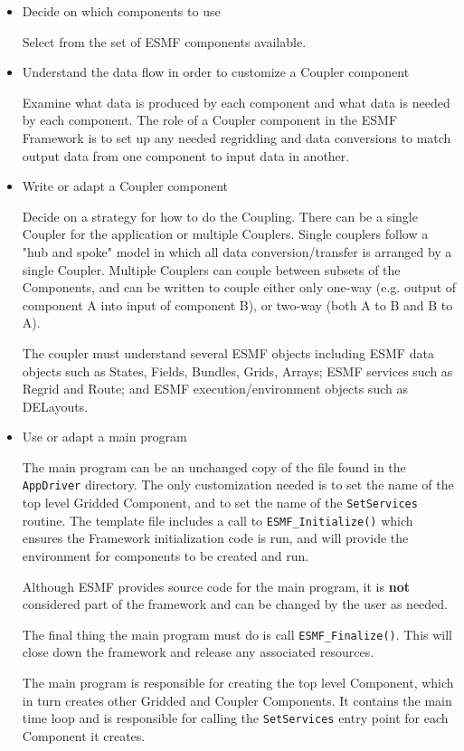 \begin{itemize}

\item Decide on which components to use 

Select from the set of ESMF components available.

\item Understand the data flow in order to customize a Coupler component

Examine what data is produced by each component and what data is
needed by each component.  The role of a Coupler component in the
ESMF Framework is to set up any needed regridding and data conversions
to match output data from one component to input data in another.

\item Write or adapt a Coupler component

Decide on a strategy for how to do the Coupling.  There can be a single
Coupler for the application or multiple Couplers.
Single couplers follow a "hub and
spoke" model in which all data conversion/transfer is arranged
by a single Coupler.
Multiple Couplers can couple between subsets of the Components, and
can be written to couple either only one-way
(e.g. output of component A into input of component B), or two-way
(both A to B and B to A).  

The coupler must understand several ESMF objects including ESMF data objects
such as States, Fields, Bundles, Grids, Arrays; ESMF services
such as Regrid and Route; and ESMF execution/environment objects
such as DELayouts.    

\item Use or adapt a main program 

The main program can be an unchanged copy of the file found in
the {\tt AppDriver} directory.  The only customization needed is to
set the name of the top level Gridded Component, and to set the
name of the {\tt SetServices} routine.  The template file includes
a call to {\tt ESMF\_Initialize()} which ensures the Framework
initialization code is run, and will
provide the environment for components to be created and run.

Although ESMF provides source code for the main program, it is
{\bf not} considered part of the framework and can be changed by
the user as needed.

The final thing the main program must do is call {\tt ESMF\_Finalize()}.
This will close down the framework and release any associated resources.

The main program is responsible for creating the top level
Component, which in turn creates other Gridded and Coupler Components.  
It contains the main time loop and is responsible for calling the
{\tt SetServices} entry point for each Component it creates.

\end{itemize}



